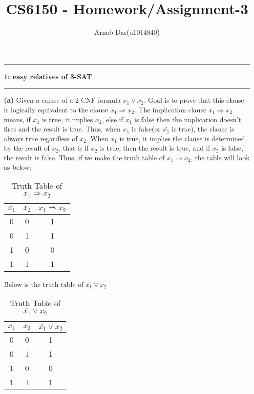 \documentclass{article}
\title{CS6150 - Homework/Assignment-3}
\author{Arnab Das(u1014840)}
\newcommand\question[2]{\vspace{.25in}\hrule\textbf{#1: #2}\hrule\vspace{.10in}}
\renewcommand\part[1]{\vspace{.10in}\textbf{(#1)}}
\begin{document}
  \maketitle
  \newpage
  \newcommand\NAME{ARNAB DAS}
  \newcommand\UID{uxxxxxxx}
  \newcommand\HWNUM{3}

  \question{1}{easy relatives of 3-SAT}
	\part{a} Given a caluse of a 2-CNF formula $x_{1} \vee x_{2}$. Goal is to prove that this clause is logically equivalent to the clause $x_{1} \Rightarrow x_{2}$.  The implication clause $x_{1} \Rightarrow x_{2}$ means, if $x_{1}$ is true, it implies $x_{2}$, else if $x_{1}$ is false then the implication doesn't fires and the result is true. Thus, when $x_{1}$ is false(or $\bar {x_{1}}$ is true), the clause is always true regardless of $x_{2}$. When $x_{1}$ is true, it implies the clause is determined by the result of $x_{2}$, that is if $x_{2}$ is true, then the result is true, and if $x_{2}$ is false, the result is false. Thus, if we make the truth table of $x_{1} \Rightarrow x_{2}$, the table will look as below: \newline
\begin{table}[ht]
  \caption{Truth Table of $x_{1} \Rightarrow x_{2}$}
  \centering
  \begin{tabular}{c c c }
  \hline\hline
  $x_{1}$ & $x_{2}$ & $x_{1} \Rightarrow x_{2}$ \\[0.5ex]
  \hline
  0 & 0 & 1 \\
  0 & 1 & 1 \\
  1 & 0 & 0 \\
  1 & 1 & 1 \\ [0.5ex]
  \end{tabular}
  \label{table:nonlin}
  \end{table}	  

Below is the truth table of $\bar{x_{1}} \vee x_{2}$ \newline
\begin{table}[ht]
  \caption{Truth Table of $\bar{x_{1}} \vee x_{2}$}
  \centering
  \begin{tabular}{c c c }
  \hline\hline
  $x_{1}$ & $x_{2}$ & $\bar{x_{1}} \vee x_{2}$ \\[0.5ex]
  \hline
  0 & 0 & 1 \\
  0 & 1 & 1 \\
  1 & 0 & 0 \\
  1 & 1 & 1 \\ [0.5ex]
  \end{tabular}
  \label{table:nonlin}
  \end{table}	 
\end{document}
